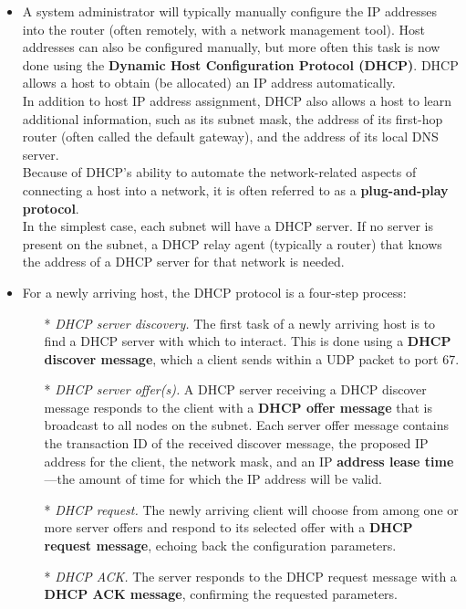 \begin{itemize}
\item
A system administrator will typically manually configure the IP addresses into the router (often remotely, with a network management tool). Host addresses can also be configured manually, but more often this task is now done using the \textbf{Dynamic Host Configuration Protocol (DHCP)}. DHCP allows a host to obtain (be allocated) an IP address automatically.\\
In addition to host IP address assignment, DHCP also allows a host to learn additional information, such as its subnet mask, the address of its first-hop router (often called the default gateway), and the address of its local DNS server.\\
Because of DHCP's ability to automate the network-related aspects of connecting a host into a network, it is often referred to as a \textbf{plug-and-play protocol}.\\
In the simplest case, each subnet will have a DHCP server. If no server is present on the subnet, a DHCP relay agent (typically a router) that knows the address of a DHCP server for that network is needed.

\item
For a newly arriving host, the DHCP protocol is a four-step process:
\begin{itemize}
\item[*]\textit{DHCP server discovery.} The first task of a newly arriving host is to find a DHCP server with which to interact. This is done using a \textbf{DHCP discover message}, which a client sends within a UDP packet to port 67.
\item[*]\textit{DHCP server offer(s).} A DHCP server receiving a DHCP discover message responds to the client with a \textbf{DHCP offer message} that is broadcast to all nodes on the subnet. Each server offer message contains the transaction ID of the received discover message, the proposed IP address for the client, the network mask, and an IP 	\textbf{address lease time}---the amount of time for which the IP address will be valid.
\item[*]\textit{DHCP request.} The newly arriving client will choose from among one or more server offers and respond to its selected offer with a \textbf{DHCP request message}, echoing back the configuration parameters.
\item[*]\textit{DHCP ACK.} The server responds to the DHCP request message with a \textbf{DHCP ACK message}, confirming the requested parameters.
\end{itemize}


\end{itemize}
